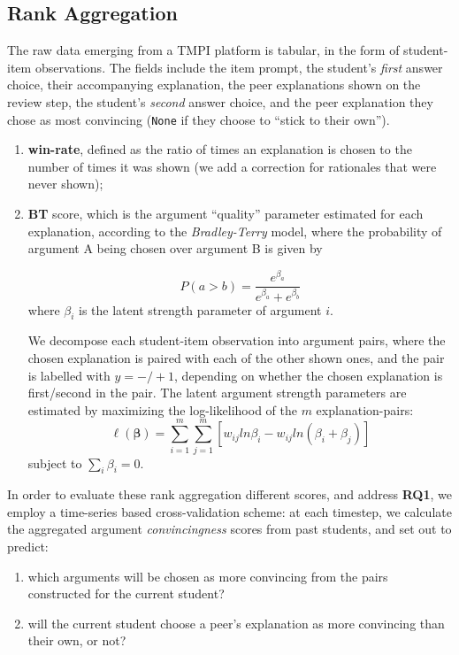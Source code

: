 \documentclass[sigconf]{acmart}
\begin{document}
\subsection{Rank Aggregation}
The raw data emerging from a TMPI platform is tabular, in the form of 
student-item observations.
The fields include the item prompt, the student's \textit{first} answer choice, 
their accompanying explanation, the peer explanations shown on the review step, 
the student's \textit{second} answer choice, and the peer explanation they 
chose as most convincing (\verb|None| if they choose to ``stick to their own'').

\begin{enumerate}
	\item \textbf{win-rate}, defined as the ratio of times an explanation is 
	chosen to the number of times it was shown (we add a correction for 
	rationales that were never shown); 
	\item \textbf{BT} score, which is the argument ``quality'' parameter 
	estimated for each explanation, according to the \textit{Bradley-Terry} 
	model, where the probability of argument A being chosen over argument B is 
	given by 

	$$
	P(a>b) = 
	\frac{e^{\beta_a}}{e^{\beta_a}+e^{\beta_b}}
	$$
	where $\beta_i$ is the latent strength parameter of argument $i$. 
	
	We decompose each student-item observation into argument pairs, where the 
	chosen explanation is paired with each of the other shown ones, and the 
	pair is labelled with $y=-/+1$, depending on whether the chosen explanation 
	is first/second in the pair.   
	The latent argument strength parameters are estimated by maximizing the 
	log-likelihood of the $m$ explanation-pairs:
	$$
	\ell(\boldsymbol{\beta})=\sum_{i=1}^{m}\sum_{j=1}^{m} 
	[w_{ij}ln\beta_i-w_{ij}ln(\beta_i+\beta_j)]
	$$
	subject to $\sum_{i}\beta_i=0$.
\end{enumerate}

In order to evaluate these rank aggregation different scores, and address 
\textbf{RQ1}, we employ a time-series based cross-validation scheme:
at each timestep, we calculate the aggregated argument \textit{convincingness} 
scores from past students, and set out to predict:
\begin{enumerate}
	\item which arguments will be chosen as more convincing from the pairs 
	constructed for the current student?  
	\item will the current student choose a peer's explanation as more 
	convincing than their own, or not?
\end{enumerate}
\end{document}
